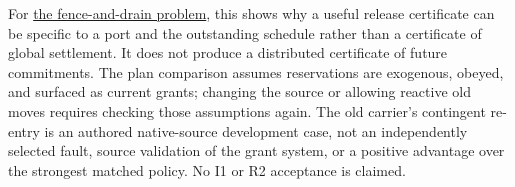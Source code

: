 \documentclass[11pt]{article}
\begin{document}
For \href{https://github.com/eternal-november/eos-research-programmes/pull/419}{the fence-and-drain problem}, this shows why a useful release certificate can be specific to a port and the outstanding schedule rather than a certificate of global settlement. It does not produce a distributed certificate of future commitments. The plan comparison assumes reservations are exogenous, obeyed, and surfaced as current grants; changing the source or allowing reactive old moves requires checking those assumptions again. The old carrier's contingent re-entry is an authored native-source development case, not an independently selected fault, source validation of the grant system, or a positive advantage over the strongest matched policy. No I1 or R2 acceptance is claimed.
\end{document}
